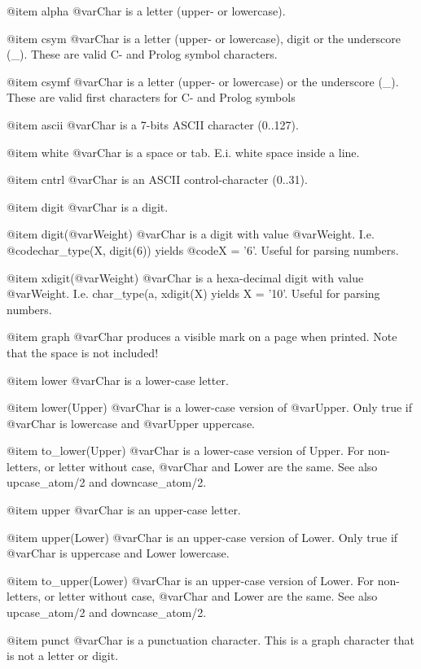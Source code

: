 {{{{@item    alpha
        @var{Char} is a letter (upper- or lowercase).

@item    csym
        @var{Char} is a letter (upper- or lowercase), digit or the underscore (_). These are valid C- and Prolog symbol characters.

@item    csymf
        @var{Char} is a letter (upper- or lowercase) or the underscore (_). These are valid first characters for C- and Prolog symbols

@item    ascii
        @var{Char} is a 7-bits ASCII character (0..127).

@item    white
        @var{Char} is a space or tab. E.i. white space inside a line.

@item    cntrl
        @var{Char} is an ASCII control-character (0..31).

@item    digit
        @var{Char} is a digit.

@item    digit(@var{Weight})
        @var{Char} is a digit with value
        @var{Weight}. I.e. @code{char_type(X, digit(6))} yields @code{X =
        '6'}. Useful for parsing numbers.

@item    xdigit(@var{Weight})
        @var{Char} is a hexa-decimal digit with value @var{Weight}. I.e. char_type(a, xdigit(X) yields X = '10'. Useful for parsing numbers.

@item    graph
        @var{Char} produces a visible mark on a page when printed. Note that the space is not included!

@item    lower
        @var{Char} is a lower-case letter.

@item    lower(Upper)
        @var{Char} is a lower-case version of @var{Upper}. Only true if
        @var{Char} is lowercase and @var{Upper} uppercase.

@item    to_lower(Upper)
        @var{Char} is a lower-case version of Upper. For non-letters, or letter without case, @var{Char} and Lower are the same. See also upcase_atom/2 and downcase_atom/2.

@item    upper
        @var{Char} is an upper-case letter.

@item    upper(Lower)
        @var{Char} is an upper-case version of Lower. Only true if @var{Char} is uppercase and Lower lowercase.

@item    to_upper(Lower)
        @var{Char} is an upper-case version of Lower. For non-letters, or letter without case, @var{Char} and Lower are the same. See also upcase_atom/2 and downcase_atom/2.

@item    punct
        @var{Char} is a punctuation character. This is a graph character that is not a letter or digit.

}}}}
